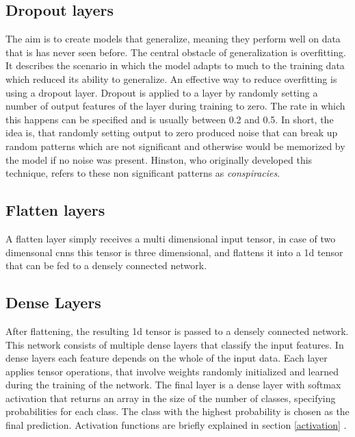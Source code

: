 \subsection{Dropout layers}
\label{dropout}
The aim is to create models that generalize, meaning they perform well on data that is has never seen before. The central obstacle of generalization is overfitting. It describes the scenario in which the model adapts to much to the training data which reduced its ability to generalize. An effective way to reduce overfitting is using a dropout layer. Dropout is applied to a layer by randomly setting a number of output features of the layer during training to zero. The rate in which this happens can be specified and is usually between 0.2 and 0.5. In short, the idea is, that randomly setting output to zero produced noise that can break up random patterns which are not significant and otherwise would be memorized by the model if no noise was present. Hinston, who originally developed this technique, refers to these non significant patterns as \textit{conspiracies}. 

\subsection{Flatten layers}
\label{flatten}
A flatten layer simply receives a multi dimensional input tensor, in case of two dimensonal cnns this tensor is three dimensional, and flattens it into a 1d tensor that can be fed to a densely connected network. 

\subsection{Dense Layers}
\label{dense}
After flattening, the resulting 1d tensor is passed to a densely connected network. This network consists of multiple dense layers that classify the input features. In dense layers each feature depends on the whole of the input data. Each layer applies tensor operations, that involve weights randomly initialized and learned during the training of the network. The final layer is a dense layer with softmax activation that returns an array in the size of the number of classes, specifying probabilities for each class. The class with the highest probability is chosen as the final prediction. Activation functions are briefly explained in section \ref{activation} . 

\newpage

